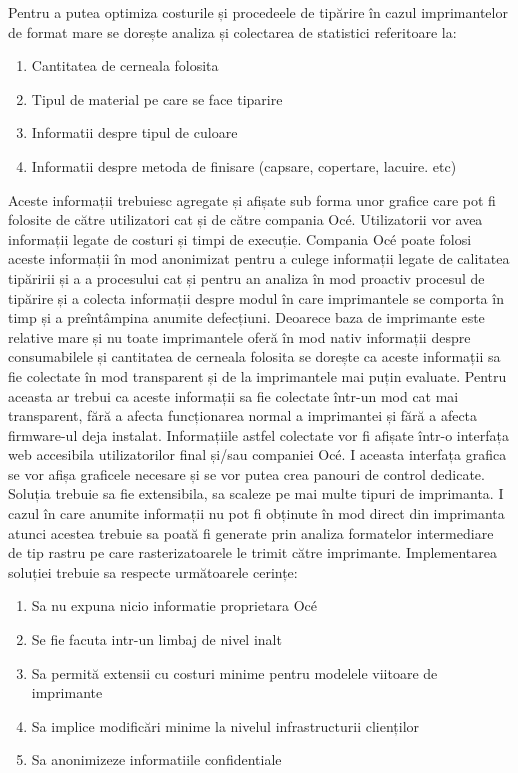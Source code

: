 \documentclass[12pt]{report}
\begin{document}
Pentru a putea optimiza costurile și procedeele de tipărire în cazul imprimantelor de format mare se dorește analiza și colectarea de statistici referitoare la: 
\begin{enumerate}
\item Cantitatea de cerneala folosita
\item Tipul de material pe care se face tiparire
\item Informatii despre tipul de culoare
\item Informatii despre metoda de finisare (capsare, copertare, lacuire. etc)
\end{enumerate}
Aceste informații trebuiesc agregate și afișate sub forma unor grafice care pot fi folosite de către utilizatori cat și de către compania Océ. Utilizatorii vor avea informații legate de costuri și timpi de execuție. Compania Océ poate folosi aceste informații în mod anonimizat pentru a culege informații legate de calitatea tipăririi și a a procesului cat și pentru an analiza în mod proactiv procesul de tipărire și a colecta informații despre modul în care imprimantele se comporta în timp și a preîntâmpina anumite defecțiuni.
Deoarece baza de imprimante este relative mare și nu toate imprimantele oferă în mod nativ informații despre consumabilele și cantitatea de cerneala folosita se dorește ca aceste informații sa fie colectate în mod transparent și de la imprimantele mai puțin evaluate. Pentru aceasta ar trebui ca aceste informații sa fie colectate într-un mod cat mai transparent, fără a afecta funcționarea normal a imprimantei și fără a afecta firmware-ul deja instalat.
Informațiile astfel colectate vor fi afișate într-o interfața web accesibila utilizatorilor final și/sau companiei Océ. I aceasta interfața grafica se vor afișa graficele necesare și se vor putea crea panouri de control dedicate.
Soluția trebuie sa fie extensibila, sa scaleze pe mai multe tipuri de imprimanta.
I cazul în care anumite informații nu pot fi obținute în mod direct din imprimanta atunci acestea trebuie sa poată fi generate prin analiza formatelor intermediare de tip rastru pe care rasterizatoarele le trimit către imprimante.
Implementarea soluției trebuie sa respecte următoarele cerințe:
\begin{enumerate}
\item Sa nu expuna nicio informatie proprietara Océ
\item Se fie facuta intr-un limbaj de nivel inalt
\item Sa permită extensii cu costuri minime pentru modelele viitoare de imprimante
\item Sa implice modificări minime la nivelul infrastructurii clienților
\item Sa anonimizeze informatiile confidentiale
\end{enumerate}
\end{document}
